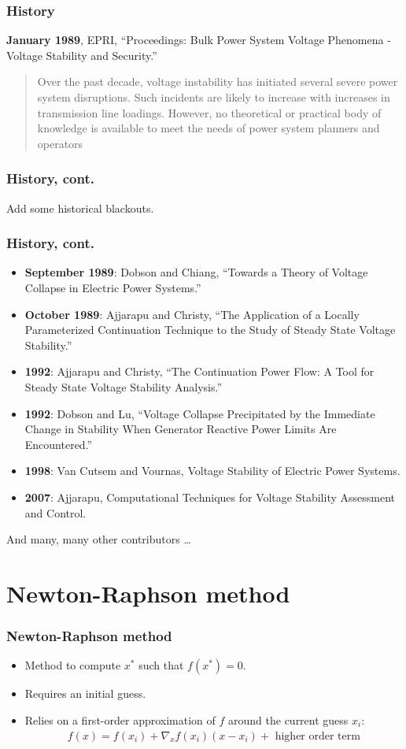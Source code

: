 \documentclass{beamer}
\begin{document}
\begin{frame}
  \frametitle{History}
\textbf{January 1989}, EPRI, “Proceedings: Bulk Power System Voltage Phenomena - Voltage Stability and Security.”
  \begin{quote}
    Over the past decade, voltage instability has initiated several severe power system disruptions. Such incidents are likely to increase with increases in transmission line loadings. However, no theoretical or practical body of knowledge is available to meet the needs of power system planners and operators
  \end{quote}
\end{frame}

\begin{frame}
  \frametitle{History, cont.}
Add some historical blackouts.
\end{frame}

\begin{frame}
  \frametitle{History, cont.}
  \begin{itemize}
  \item \textbf{September 1989}: Dobson and Chiang, “Towards a Theory of Voltage Collapse in Electric Power Systems.”
  \item \textbf{October 1989}: Ajjarapu and Christy, “The Application of a Locally Parameterized Continuation Technique to the Study of Steady State Voltage Stability.”
  \item \textbf{1992}: Ajjarapu and Christy, “The Continuation Power Flow: A Tool for Steady State Voltage Stability Analysis.”
  \item \textbf{1992}: Dobson and Lu, “Voltage Collapse Precipitated by the Immediate Change in Stability When Generator Reactive Power Limits Are Encountered.”
  \item \textbf{1998}: Van Cutsem and Vournas, Voltage Stability of Electric Power Systems.
  \item \textbf{2007}: Ajjarapu, Computational Techniques for Voltage Stability Assessment and Control.
  \end{itemize}
And many, many other contributors \ldots
\end{frame}


\section[NR method]{Newton-Raphson method}
\label{sec:newt-raphs-meth}


\begin{frame}
  \frametitle{Newton-Raphson method}
  \begin{itemize}
  \item Method to compute $x^{*}$ such that $f(x^{*}) = 0$.
  \item Requires an initial guess.
  \item Relies on a first-order approximation of $f$ around the current guess $x_i$:
    \begin{align}
      f(x) = f(x_i) + \nabla_x f(x_i) (x-x_i) + \text{ higher order term}
    \end{align}
  \end{itemize}
\end{frame}
\end{document}
